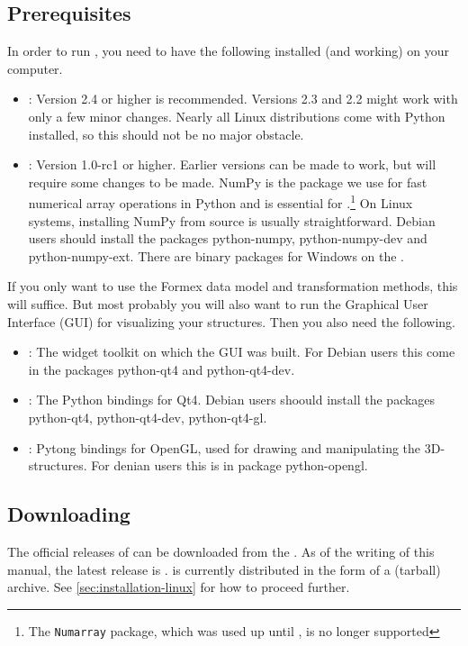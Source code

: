 \subsection{Prerequisites}
\label{sec:prerequisites}
In order to run \pyformex, you need to have the following installed (and working) on your computer.
\begin{itemize}
\item {}: Version 2.4 or higher is recommended. Versions 2.3 and 2.2 might work with only a few minor changes.
Nearly all Linux distributions come with Python installed, so this should not be no major obstacle.
\item {}: Version 1.0-rc1 or higher. Earlier versions can be made to work, but will require some changes to be made. NumPy is the package we use for fast numerical array operations in Python and is essential for \pyformex.\footnote{The \texttt{Numarray} package, which was used up until , is no longer supported }
On Linux systems, installing NumPy from source is usually straightforward. Debian users should install the packages python-numpy, python-numpy-dev and python-numpy-ext. There are binary packages for Windows on the .
\end{itemize}
If you only want to use the Formex data model and transformation methods, this will suffice. But most probably you will also want to run the \pyformex Graphical User Interface (GUI) for visualizing your structures. Then you also need the following. 
\begin{itemize}
\item {}: The widget toolkit on which the GUI was built. For Debian users this  come in the packages python-qt4 and python-qt4-dev.
\item {}: The Python bindings for Qt4. Debian users shoould install the packages python-qt4, python-qt4-dev, python-qt4-gl.
\item {}: Pytong bindings for OpenGL, used for drawing and manipulating the 3D-structures. For denian users this is in package python-opengl.
\end{itemize}



\subsection{Downloading}
\label{sec:downloading}
The official releases of \pyformex can be downloaded from the 
. As of the writing of this manual, the latest release is . 
\pyformex is currently distributed in the form of a  (tarball) archive. See \ref{sec:installation-linux} for how to proceed further.

